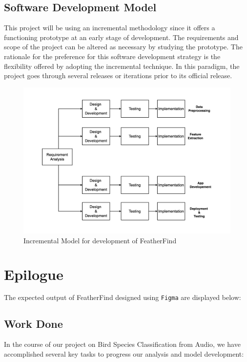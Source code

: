 \newpage
\section{Software Development Model}
This project will be using an incremental methodology since it offers a
functioning prototype at an early stage of development. The requirements and
scope of the project can be altered as necessary by studying the prototype. The
rationale for the preference for this software development strategy is the
flexibility offered by adopting the incremental technique. In this paradigm,
the project goes through several releases or iterations prior to its official
release.
\begin{figure}[h!]
    \includegraphics[scale=0.25]{images/SDLC.png}
    \caption{Incremental Model for development of
        FeatherFind}%
\end{figure}
\newpage

\chapter{Epilogue}
The expected output of FeatherFind designed using \texttt{Figma} are displayed
below:

\section{Work Done}
In the course of our project on Bird Species Classification from Audio, we have accomplished several key tasks to progress our analysis and model development:

